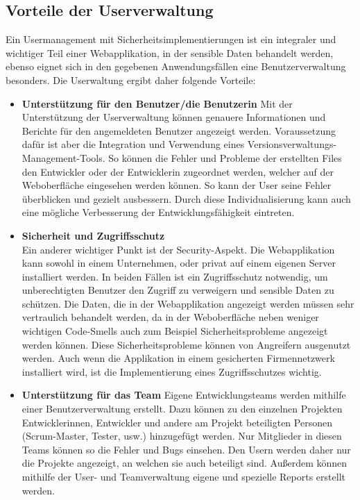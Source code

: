 \subsection{Vorteile der Userverwaltung}
Ein Usermanagement mit Sicherheitsimplementierungen ist ein integraler und wichtiger Teil einer Webapplikation, in der sensible Daten behandelt werden, ebenso eignet sich in den gegebenen Anwendungsfällen eine Benutzerverwaltung besonders. Die Userwaltung ergibt daher folgende Vorteile:
\begin{itemize} 
  \item \textbf{Unterstützung für den Benutzer/die Benutzerin} 
Mit der Unterstützung der Userverwaltung können genauere Informationen und Berichte für den angemeldeten Benutzer angezeigt werden. Voraussetzung dafür ist aber die Integration und Verwendung eines Versionsverwaltungs-Management-Tools. So können die Fehler und Probleme der erstellten Files den Entwickler oder der Entwicklerin zugeordnet werden, welcher auf der Weboberfläche eingesehen werden können. So kann der User seine Fehler überblicken und gezielt ausbessern. Durch diese Individualisierung kann auch eine mögliche Verbesserung der Entwicklungsfähigkeit eintreten.  
    \item \textbf{Sicherheit und Zugriffsschutz} \\ Ein anderer wichtiger Punkt ist der Security-Aspekt. Die Webapplikation kann sowohl in einem Unternehmen, oder privat auf einem eigenen Server installiert werden. In beiden Fällen ist ein Zugriffsschutz notwendig, um unberechtigten Benutzer den Zugriff zu verweigern und sensible Daten zu schützen. Die Daten, die in der Webapplikation angezeigt werden müssen sehr vertraulich behandelt werden, da in der Weboberfläche neben weniger wichtigen Code-Smells auch zum Beispiel Sicherheitsprobleme angezeigt werden können. Diese Sicherheitsprobleme können von Angreifern ausgenutzt werden. Auch wenn die Applikation in einem gesicherten Firmennetzwerk installiert wird, ist die Implementierung eines Zugriffsschutzes wichtig. 
\item \textbf{Unterstützung für das Team}
Eigene Entwicklungsteams werden mithilfe einer Benutzerverwaltung erstellt. Dazu können zu den einzelnen Projekten Entwicklerinnen, Entwickler und andere am Projekt beteiligten Personen (Scrum-Master, Tester, usw.) hinzugefügt werden. Nur Mitglieder in diesen Teams können so die Fehler und Bugs einsehen. Den Usern werden daher nur die Projekte angezeigt, an welchen sie auch beteiligt sind. Außerdem können mithilfe der User- und Teamverwaltung eigene und spezielle Reports erstellt werden.
\end{itemize}

